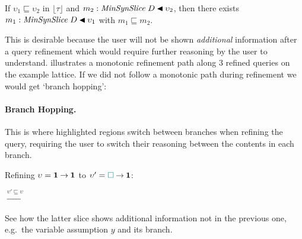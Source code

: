 \begin{theorem}\label{thm:mono}
If $\upsilon_1 \sqsubseteq \upsilon_2$ in $\lfloor\tau\rfloor$ and $m_2 : \mathit{MinSynSlice}\;D \mathbin{\blacktriangleleft} \upsilon_2$, then there exists $m_1 : \mathit{MinSynSlice}\;D \mathbin{\blacktriangleleft} \upsilon_1$ with $m_1 \sqsubseteq m_2$.
\end{theorem}

This is desirable because the user will not be shown \textit{additional} information after a query refinement which would require further reasoning by the user to understand.  illustrates a monotonic refinement path along 3 refined queries on the example lattice. If we did not follow a monotonic path during refinement we would get `branch hopping':

\paragraph{Branch Hopping.} This is where highlighted regions switch between branches when refining the query, requiring the user to switch their reasoning between the contents in each branch. 

\begin{exmp} Refining $\upsilon = \mathbf{1}\mathbin{\to}\mathbf{1}$ to $\upsilon' = {\color{teal}\Box}\mathbin{\to}\mathbf{1}$:
\begin{center}
%
\quad$\xrightarrow{\upsilon' \sqsubseteq \upsilon}$\quad
{}
\end{center}

See how the latter slice shows additional information not in the previous one, e.g.\ the variable assumption $y$ and its branch.
\end{exmp}

